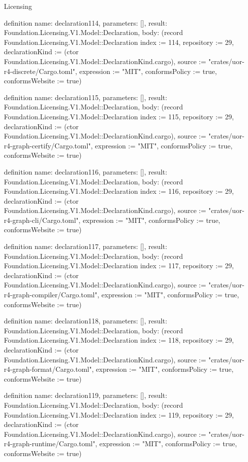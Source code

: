 \begin{lexlean}{Licensing}
\begin{semanticmodule}
definition{
  name: declaration114,
  parameters: [],
  result: Foundation.Licensing.V1.Model::Declaration,
  body: (record Foundation.Licensing.V1.Model::Declaration {index := 114, repository := 29, declarationKind := (ctor Foundation.Licensing.V1.Model::DeclarationKind.cargo), source := "crates/uor-r4-discrete/Cargo.toml", expression := "MIT", conformsPolicy := true, conformsWebsite := true})
}

definition{
  name: declaration115,
  parameters: [],
  result: Foundation.Licensing.V1.Model::Declaration,
  body: (record Foundation.Licensing.V1.Model::Declaration {index := 115, repository := 29, declarationKind := (ctor Foundation.Licensing.V1.Model::DeclarationKind.cargo), source := "crates/uor-r4-graph-certify/Cargo.toml", expression := "MIT", conformsPolicy := true, conformsWebsite := true})
}

definition{
  name: declaration116,
  parameters: [],
  result: Foundation.Licensing.V1.Model::Declaration,
  body: (record Foundation.Licensing.V1.Model::Declaration {index := 116, repository := 29, declarationKind := (ctor Foundation.Licensing.V1.Model::DeclarationKind.cargo), source := "crates/uor-r4-graph-cli/Cargo.toml", expression := "MIT", conformsPolicy := true, conformsWebsite := true})
}

definition{
  name: declaration117,
  parameters: [],
  result: Foundation.Licensing.V1.Model::Declaration,
  body: (record Foundation.Licensing.V1.Model::Declaration {index := 117, repository := 29, declarationKind := (ctor Foundation.Licensing.V1.Model::DeclarationKind.cargo), source := "crates/uor-r4-graph-compiler/Cargo.toml", expression := "MIT", conformsPolicy := true, conformsWebsite := true})
}

definition{
  name: declaration118,
  parameters: [],
  result: Foundation.Licensing.V1.Model::Declaration,
  body: (record Foundation.Licensing.V1.Model::Declaration {index := 118, repository := 29, declarationKind := (ctor Foundation.Licensing.V1.Model::DeclarationKind.cargo), source := "crates/uor-r4-graph-format/Cargo.toml", expression := "MIT", conformsPolicy := true, conformsWebsite := true})
}

definition{
  name: declaration119,
  parameters: [],
  result: Foundation.Licensing.V1.Model::Declaration,
  body: (record Foundation.Licensing.V1.Model::Declaration {index := 119, repository := 29, declarationKind := (ctor Foundation.Licensing.V1.Model::DeclarationKind.cargo), source := "crates/uor-r4-graph-runtime/Cargo.toml", expression := "MIT", conformsPolicy := true, conformsWebsite := true})
}


\end{semanticmodule}
\end{lexlean}
